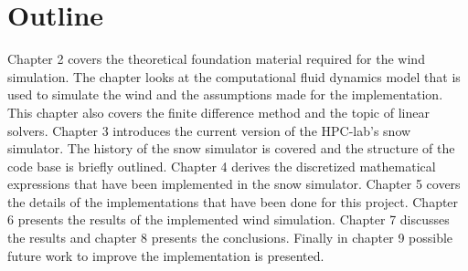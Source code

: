 \section{Outline}

Chapter 2 covers the theoretical foundation material required for the wind
simulation. The chapter looks at the computational fluid dynamics model that is
used to simulate the wind and the assumptions made for the implementation. This
chapter also covers the finite difference method and the topic of linear
solvers. Chapter 3 introduces the current version of the HPC-lab's snow
simulator. The history of the snow simulator is covered and the structure of the
code base is briefly outlined. Chapter 4 derives the discretized mathematical
expressions that have been implemented in the snow simulator. Chapter 5 covers
the details of the implementations that have been done for this project. Chapter
6 presents the results of the implemented wind simulation. Chapter 7 discusses
the results and chapter 8 presents the conclusions. Finally in chapter 9
possible future work to improve the implementation is presented.
